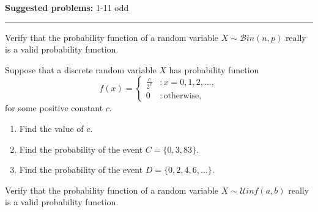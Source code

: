 \documentclass[12pt,reqno]{amsart}
\begin{document}
\textbf{Suggested problems:} 1-11 odd

\bigskip
\hrule

\bigskip
\prob Verify that the probability function of a random variable $X \sim \mathcal{B}in(n,p)$ really is a valid probability function.

\vfill
\prob Suppose that a discrete random variable $X$ has probability function
	\[
	f(x) = \begin{cases}
	\frac{c}{2^x} & : x=0,1,2,\ldots, \\
	0 & : \text{otherwise},
	\end{cases}
	\]
for some positive constant $c$.

\medskip
\begin{enumerate}
\item Find the value of $c$.\vfill
\item Find the probability of the event $C = \{0,3,83\}$.\vfill
\item Find the probability of the event $D = \{0,2,4,6,\ldots\}$.
\end{enumerate}

\vfill
\newpage
\prob Verify that the probability function of a random variable $X \sim \mathcal{U}inf(a,b)$ really is a valid probability function.
\end{document}
